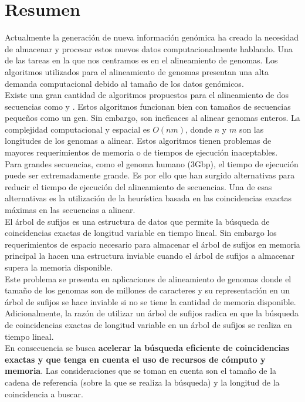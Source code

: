 \documentclass[12pt,a4paper]{article}
\begin{document}
\section{Resumen}
\indent
\cleardoublepage
{}
\indent
Actualmente la generación de nueva información genómica ha creado la necesidad de almacenar y procesar estos nuevos datos computacionalmente hablando. Una de las tareas en la que nos centramos es en el alineamiento de genomas. Los algoritmos utilizados para el alineamiento de genomas presentan una alta demanda computacional debido al tamaño de los datos genómicos.\\
\indent
Existe una gran cantidad de algoritmos propuestos para el alineamiento de dos secuencias como \cite{Needleman1970General} y \cite{Waterman}. Estos algoritmos funcionan bien con tamaños de secuencias pequeños como un gen. Sin embargo, son ineficaces al alinear genomas enteros. La complejidad computacional y espacial es $O(nm)$, donde $n$ y $m$ son las longitudes de los genomas a alinear. Estos algoritmos tienen problemas de mayores requerimientos de memoria o de tiempos de ejecución inaceptables.\\
\indent
Para grandes secuencias, como el genoma humano (3Gbp), el tiempo de ejecución puede ser extremadamente grande. Es por ello que han surgido alternativas para reducir el tiempo de ejecución del alineamiento de secuencias. Una de esas alternativas es la utilización de la heurística basada en las coincidencias exactas máximas en las secuencias a alinear.\\
\indent
El \'arbol de sufijos es una estructura de datos que permite la b\'usqueda de 
coincidencias exactas de longitud variable en tiempo lineal. Sin embargo los 
requerimientos de espacio necesario para almacenar el \'arbol de sufijos en 
memoria principal la hacen una estructura inviable cuando el \'arbol de sufijos a
almacenar supera la memoria disponible.\\
\indent
Este problema se presenta en aplicaciones de alineamiento de genomas donde el
tama\~no de los genomas son de millones de caracteres y su representaci\'on en un
\'arbol de sufijos se hace inviable si no se tiene la cantidad de memoria 
disponible. Adicionalmente, la raz\'on de utilizar un árbol de sufijos radica en
que la b\'usqueda de coincidencias exactas de longitud variable en un \'arbol de 
sufijos se realiza en tiempo lineal.\\
\indent
En consecuencia se busca \textbf{acelerar la b\'usqueda eficiente de 
coincidencias exactas y que tenga en cuenta el uso de recursos de c\'omputo y
memoria}. Las consideraciones que se toman en cuenta son el tama\~no de la cadena 
de referencia (sobre la que se realiza la b\'usqueda) y la longitud de la 
coincidencia a buscar.
\end{document}
